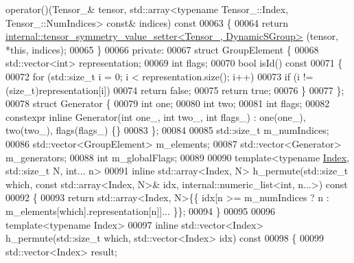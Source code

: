 \begin{DoxyCode}
       operator()(Tensor\_& tensor, std::array<typename Tensor\_::Index, Tensor\_::NumIndices> \textcolor{keyword}{const}& indices)\textcolor{keyword}{ const}
00063 \textcolor{keyword}{    }\{
00064       \textcolor{keywordflow}{return} \hyperlink{class_eigen_1_1internal_1_1tensor__symmetry__value__setter}{internal::tensor\_symmetry\_value\_setter<Tensor\_, DynamicSGroup>}
      (tensor, *\textcolor{keyword}{this}, indices);
00065     \}
00066   \textcolor{keyword}{private}:
00067     \textcolor{keyword}{struct }GroupElement \{
00068       std::vector<int> representation;
00069       \textcolor{keywordtype}{int} flags;
00070       \textcolor{keywordtype}{bool} isId()\textcolor{keyword}{ const}
00071 \textcolor{keyword}{      }\{
00072         \textcolor{keywordflow}{for} (std::size\_t i = 0; i < representation.size(); i++)
00073           \textcolor{keywordflow}{if} (i != (\textcolor{keywordtype}{size\_t})representation[i])
00074             \textcolor{keywordflow}{return} \textcolor{keyword}{false};
00075         \textcolor{keywordflow}{return} \textcolor{keyword}{true};
00076       \}
00077     \};
00078     \textcolor{keyword}{struct }Generator \{
00079       \textcolor{keywordtype}{int} one;
00080       \textcolor{keywordtype}{int} two;
00081       \textcolor{keywordtype}{int} flags;
00082       constexpr \textcolor{keyword}{inline} Generator(\textcolor{keywordtype}{int} one\_, \textcolor{keywordtype}{int} two\_, \textcolor{keywordtype}{int} flags\_) : one(one\_), two(two\_), flags(flags\_) \{\}
00083     \};
00084 
00085     std::size\_t m\_numIndices;
00086     std::vector<GroupElement> m\_elements;
00087     std::vector<Generator> m\_generators;
00088     \textcolor{keywordtype}{int} m\_globalFlags;
00089 
00090     \textcolor{keyword}{template}<\textcolor{keyword}{typename} \hyperlink{namespace_eigen_a62e77e0933482dafde8fe197d9a2cfde}{Index}, std::size\_t N, \textcolor{keywordtype}{int}... n>
00091     \textcolor{keyword}{inline} std::array<Index, N> h\_permute(std::size\_t which, \textcolor{keyword}{const} std::array<Index, N>& idx, 
      internal::numeric\_list<int, n...>)\textcolor{keyword}{ const}
00092 \textcolor{keyword}{    }\{
00093       \textcolor{keywordflow}{return} std::array<Index, N>\{\{ idx[n >= m\_numIndices ? n : m\_elements[which].representation[n]]... \}\};
00094     \}
00095 
00096     \textcolor{keyword}{template}<\textcolor{keyword}{typename} Index>
00097     \textcolor{keyword}{inline} std::vector<Index> h\_permute(std::size\_t which, std::vector<Index> idx)\textcolor{keyword}{ const}
00098 \textcolor{keyword}{    }\{
00099       std::vector<Index> result;

\end{DoxyCode}
